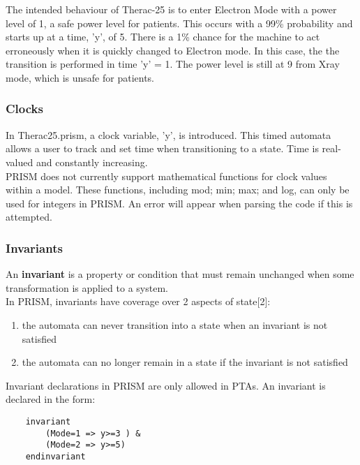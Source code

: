 \documentclass[a4paper]{article}
\begin{document}
The intended behaviour of Therac-25 is to enter Electron Mode with a power level of 1, a safe power level for patients. This occurs with a 99\% probability and starts up at a time, 'y', of 5. There is a 1\% chance for the machine to act erroneously when it is quickly changed to Electron mode. In this case, the the transition is performed in time 'y' = 1. The power level is still at 9 from Xray mode, which is unsafe for patients. 

\subsubsection{Clocks}
In Therac25.prism, a clock variable, 'y', is introduced. This timed automata allows a user to track and set time when transitioning to a state. Time is real-valued and constantly increasing. 
\\[1\baselineskip]
PRISM does not currently support mathematical functions for clock values within a model. These functions, including mod; min; max; and log, can only be used for integers in PRISM. An error will appear when parsing the code if this is attempted. 
\\[1\baselineskip]
\subsubsection{Invariants}
An \textbf{invariant} is a property or condition that must remain unchanged when some transformation is applied to a system.
\\[1\baselineskip]
In PRISM, invariants have coverage over 2 aspects of state[2]:

\begin{enumerate}
\item the automata can never transition into a state when an invariant is not satisfied
\item the automata can no longer remain in a state if the invariant is not satisfied 
\end{enumerate}

Invariant declarations in PRISM are only allowed in PTAs. An invariant is declared in the form:

\begin{lstlisting}
    invariant
        (Mode=1 => y>=3 ) &
        (Mode=2 => y>=5)
    endinvariant
\end{lstlisting}
\end{document}
